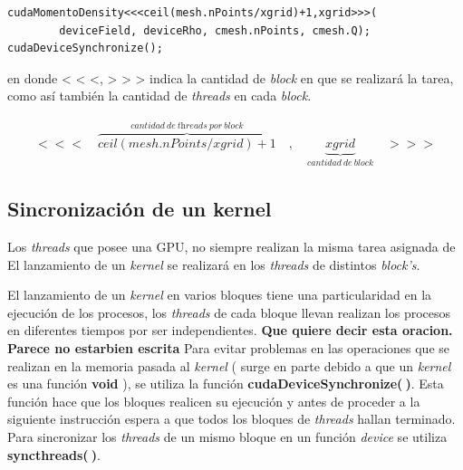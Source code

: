 {\footnotesize
	\begin{frame}{}
		\begin{lstlisting}
cudaMomentoDensity<<<ceil(mesh.nPoints/xgrid)+1,xgrid>>>(
 		deviceField, deviceRho, cmesh.nPoints, cmesh.Q);  
cudaDeviceSynchronize();

		\end{lstlisting}
		
	\end{frame}
}

en donde < < <, > > > indica la cantidad de \textit{block} en que se realizará la tarea, como así también la cantidad de \textit{threads} en cada \textit{block}.

\begin{align*}
		<<<\quad \overbrace{ceil(mesh.nPoints/xgrid)+1}^{cantidad \>de\> \textit{threads}\> por\> \textit{block}}\quad,\quad \underbrace{xgrid}_{cantidad\>de\>block} \quad>>>
\end{align*}

\subsection{Sincronización de un kernel}

Los \textit{threads} que posee una GPU, no siempre realizan la misma tarea asignada de  El lanzamiento de un \textit{kernel} se realizará en los \textit{threads} de distintos \textit{block's}. 


El lanzamiento de un \textit{kernel} en varios bloques tiene una particularidad en la ejecución de los procesos, los \textit{threads} de cada bloque llevan realizan los procesos en diferentes tiempos por ser independientes. \textbf{Que quiere decir esta oracion. Parece no estarbien escrita} Para evitar problemas en las operaciones que se realizan en la memoria pasada al \textit{kernel} ( surge en parte debido a que un \textit{kernel} es una función \textbf{void} ), se utiliza la función \textbf{cudaDeviceSynchronize($\>$)}. Esta función hace que los bloques realicen su ejecución y antes de proceder a la siguiente instrucción espera a que todos los bloques de \textit{threads} hallan terminado. Para sincronizar los \textit{threads} de un mismo bloque en un función \textit{device} se utiliza \textbf{syncthreads($\>$)}.


